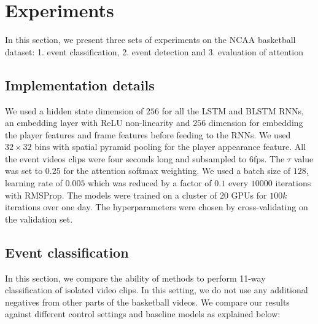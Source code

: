 
\section{Experiments}
\label{sec:experiments}

In this section, we present three sets of experiments on the NCAA basketball
dataset: 1. event classification, 2. event detection and 3. evaluation of
attention


\subsection{Implementation details}

 We used a hidden state dimension of $256$ for all the LSTM and
BLSTM RNNs, an embedding layer with ReLU non-linearity and $256$ dimension for
embedding the player features and frame features before feeding to the RNNs.
We used $32 \times 32$ bins with spatial pyramid pooling for the player appearance
feature.
All the event videos clips were four seconds long and subsampled to 6fps.  The
$\tau$ value was set to $0.25$ for the attention softmax weighting. We used a
batch size of $128$, learning rate of $0.005$ which was reduced by a factor of
$0.1$ every $10000$ iterations with RMSProp\cite{RMSProp}. The models were trained on
a cluster of $20$ GPUs for $100k$ iterations over one day.
The hyperparameters were chosen by cross-validating on the
validation set.

\subsection{Event classification}

In this section, we compare the ability of methods to perform 11-way classification of isolated video clips.
In this setting, we do not use any
additional negatives from other parts of the basketball videos.
We compare our results
against different control settings and baseline models as explained
below:



